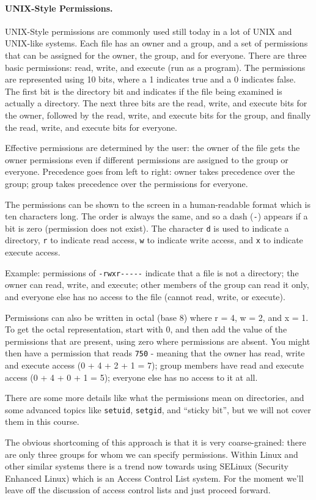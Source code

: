 \paragraph{UNIX-Style Permissions.}
UNIX-Style permissions are commonly used still today in a lot of UNIX and UNIX-like systems. Each file has an owner and a group, and a set of permissions that can be assigned for the owner, the group, and for everyone. There are three basic permissions: read, write, and execute (run as a program). The permissions are represented using 10 bits, where a 1 indicates true and a 0 indicates false. The first bit is the directory bit and indicates if the file being examined is actually a directory. The next three bits are the read, write, and execute bits for the owner, followed by the read, write, and execute bits for the group, and finally the read, write, and execute bits for everyone.

Effective permissions are determined by the user: the owner of the file gets the owner permissions even if different permissions are assigned to the group or everyone. Precedence goes from left to right: owner takes precedence over the group; group takes precedence over the permissions for everyone.

The permissions can be shown to the screen in a human-readable format which is ten characters long. The order is always the same, and so a dash (\texttt{-}) appears if a bit is zero (permission does not exist). The character \texttt{d} is used to indicate a directory, \texttt{r} to indicate read access, \texttt{w} to indicate write access, and \texttt{x} to indicate execute access.

Example: permissions of \texttt{-rwxr{-}{-}{-}{-}{-}} indicate that a file is not a directory; the owner can read, write, and execute; other members of the group can read it only, and everyone else has no access to the file (cannot read, write, or execute).

Permissions can also be written in octal (base 8) where r = 4, w = 2, and x = 1. To get the octal representation, start with 0, and then add the value of the  permissions that are present, using zero where permissions are absent. You might then have a permission that reads \texttt{750} - meaning that the owner has read, write and execute access (0 + 4 + 2 + 1 = 7); group members have read and execute access (0 + 4 + 0 + 1 = 5); everyone else has no access to it at all.

There are some more details like what the permissions mean on directories, and some advanced topics like \texttt{setuid}, \texttt{setgid}, and ``sticky bit'', but we will not cover them in this course.

The obvious shortcoming of this approach is that it is very coarse-grained: there are only three groups for whom we can specify permissions. Within Linux and other similar systems there is a trend now towards using SELinux (Security Enhanced Linux) which is an Access Control List system. For the moment we'll leave off the discussion of access control lists and just proceed forward.



